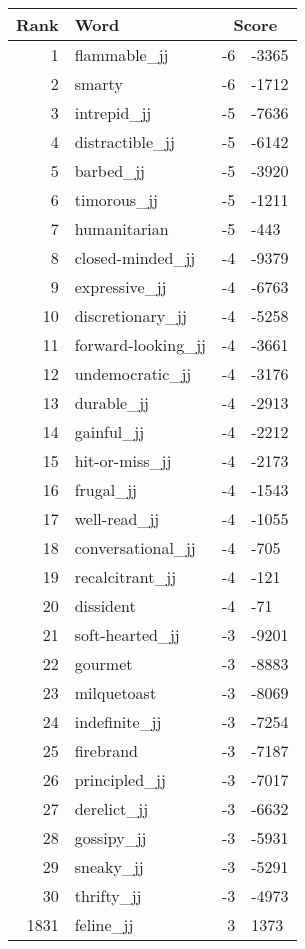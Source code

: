 \begin{longtable}[!htbp]{| rlr@{.}l |}
    \hline
    \textbf{Rank} & \textbf{Word} & \multicolumn{2}{c|}{\textbf{Score}} \\
    \hline
    \endhead
    1 & flammable\_jj & -6 & -3365 \\
    2 & smarty & -6 & -1712 \\
    3 & intrepid\_jj & -5 & -7636 \\
    4 & distractible\_jj & -5 & -6142 \\
    5 & barbed\_jj & -5 & -3920 \\
    6 & timorous\_jj & -5 & -1211 \\
    7 & humanitarian & -5 & -443 \\
    8 & closed-minded\_jj & -4 & -9379 \\
    9 & expressive\_jj & -4 & -6763 \\
    10 & discretionary\_jj & -4 & -5258 \\
    11 & forward-looking\_jj & -4 & -3661 \\
    12 & undemocratic\_jj & -4 & -3176 \\
    13 & durable\_jj & -4 & -2913 \\
    14 & gainful\_jj & -4 & -2212 \\
    15 & hit-or-miss\_jj & -4 & -2173 \\
    16 & frugal\_jj & -4 & -1543 \\
    17 & well-read\_jj & -4 & -1055 \\
    18 & conversational\_jj & -4 & -705 \\
    19 & recalcitrant\_jj & -4 & -121 \\
    20 & dissident & -4 & -71 \\
    21 & soft-hearted\_jj & -3 & -9201 \\
    22 & gourmet & -3 & -8883 \\
    23 & milquetoast & -3 & -8069 \\
    24 & indefinite\_jj & -3 & -7254 \\
    25 & firebrand & -3 & -7187 \\
    26 & principled\_jj & -3 & -7017 \\
    27 & derelict\_jj & -3 & -6632 \\
    28 & gossipy\_jj & -3 & -5931 \\
    29 & sneaky\_jj & -3 & -5291 \\
    30 & thrifty\_jj & -3 & -4973 \\
    1831 & feline\_jj & 3 & 1373 \\

\end{longtable}
